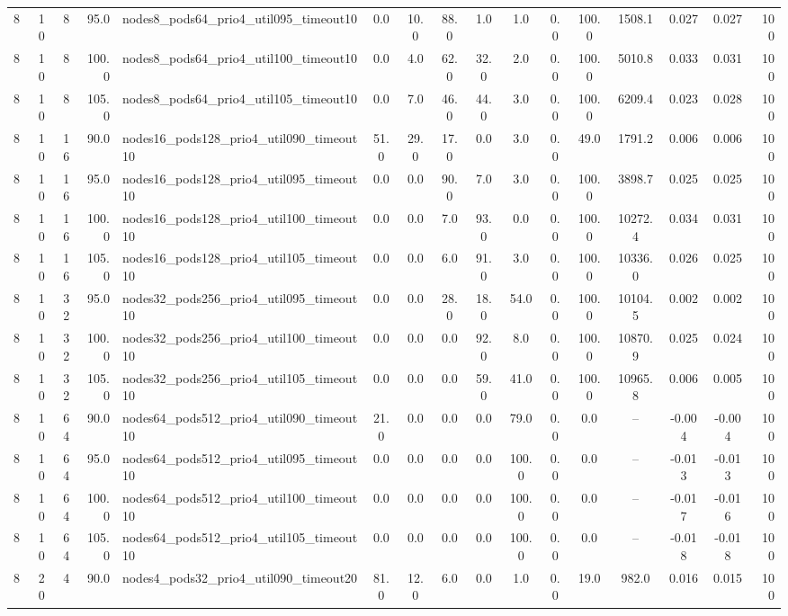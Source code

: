 \begin{tabular}{r r r r l c c c c c c c c c c r}
8 & 10 & 8 & 95.0 & nodes8\_pods64\_prio4\_util095\_timeout10 & 0.0 & 10.0 & 88.0 & 1.0 & 1.0 & 0.0 & 100.0 & 1508.1 & 0.027 & 0.027 & 100 \\
8 & 10 & 8 & 100.0 & nodes8\_pods64\_prio4\_util100\_timeout10 & 0.0 & 4.0 & 62.0 & 32.0 & 2.0 & 0.0 & 100.0 & 5010.8 & 0.033 & 0.031 & 100 \\
8 & 10 & 8 & 105.0 & nodes8\_pods64\_prio4\_util105\_timeout10 & 0.0 & 7.0 & 46.0 & 44.0 & 3.0 & 0.0 & 100.0 & 6209.4 & 0.023 & 0.028 & 100 \\
8 & 10 & 16 & 90.0 & nodes16\_pods128\_prio4\_util090\_timeout10 & 51.0 & 29.0 & 17.0 & 0.0 & 3.0 & 0.0 & 49.0 & 1791.2 & 0.006 & 0.006 & 100 \\
8 & 10 & 16 & 95.0 & nodes16\_pods128\_prio4\_util095\_timeout10 & 0.0 & 0.0 & 90.0 & 7.0 & 3.0 & 0.0 & 100.0 & 3898.7 & 0.025 & 0.025 & 100 \\
8 & 10 & 16 & 100.0 & nodes16\_pods128\_prio4\_util100\_timeout10 & 0.0 & 0.0 & 7.0 & 93.0 & 0.0 & 0.0 & 100.0 & 10272.4 & 0.034 & 0.031 & 100 \\
8 & 10 & 16 & 105.0 & nodes16\_pods128\_prio4\_util105\_timeout10 & 0.0 & 0.0 & 6.0 & 91.0 & 3.0 & 0.0 & 100.0 & 10336.0 & 0.026 & 0.025 & 100 \\
8 & 10 & 32 & 95.0 & nodes32\_pods256\_prio4\_util095\_timeout10 & 0.0 & 0.0 & 28.0 & 18.0 & 54.0 & 0.0 & 100.0 & 10104.5 & 0.002 & 0.002 & 100 \\
8 & 10 & 32 & 100.0 & nodes32\_pods256\_prio4\_util100\_timeout10 & 0.0 & 0.0 & 0.0 & 92.0 & 8.0 & 0.0 & 100.0 & 10870.9 & 0.025 & 0.024 & 100 \\
8 & 10 & 32 & 105.0 & nodes32\_pods256\_prio4\_util105\_timeout10 & 0.0 & 0.0 & 0.0 & 59.0 & 41.0 & 0.0 & 100.0 & 10965.8 & 0.006 & 0.005 & 100 \\
8 & 10 & 64 & 90.0 & nodes64\_pods512\_prio4\_util090\_timeout10 & 21.0 & 0.0 & 0.0 & 0.0 & 79.0 & 0.0 & 0.0 & -- & -0.004 & -0.004 & 100 \\
8 & 10 & 64 & 95.0 & nodes64\_pods512\_prio4\_util095\_timeout10 & 0.0 & 0.0 & 0.0 & 0.0 & 100.0 & 0.0 & 0.0 & -- & -0.013 & -0.013 & 100 \\
8 & 10 & 64 & 100.0 & nodes64\_pods512\_prio4\_util100\_timeout10 & 0.0 & 0.0 & 0.0 & 0.0 & 100.0 & 0.0 & 0.0 & -- & -0.017 & -0.016 & 100 \\
8 & 10 & 64 & 105.0 & nodes64\_pods512\_prio4\_util105\_timeout10 & 0.0 & 0.0 & 0.0 & 0.0 & 100.0 & 0.0 & 0.0 & -- & -0.018 & -0.018 & 100 \\
8 & 20 & 4 & 90.0 & nodes4\_pods32\_prio4\_util090\_timeout20 & 81.0 & 12.0 & 6.0 & 0.0 & 1.0 & 0.0 & 19.0 & 982.0 & 0.016 & 0.015 & 100 \\

\end{tabular}
